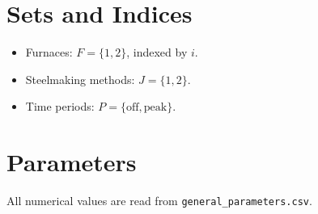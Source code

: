 \section*{Sets and Indices}

\begin{itemize}
    \item Furnaces: $F=\{1,2\}$, indexed by $i$.
    \item Steelmaking methods: $J=\{1,2\}$.
    \item Time periods: $P=\{\text{off},\text{peak}\}$.
\end{itemize}

\section*{Parameters}

All numerical values are read from \texttt{general\_parameters.csv}.

